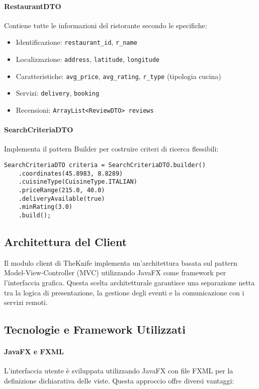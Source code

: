 \paragraph{RestaurantDTO}
Contiene tutte le informazioni del ristorante secondo le specifiche:
\begin{itemize}
    \item Identificazione: \texttt{restaurant\_id}, \texttt{r\_name}
    \item Localizzazione: \texttt{address}, \texttt{latitude}, \texttt{longitude}
    \item Caratteristiche: \texttt{avg\_price}, \texttt{avg\_rating}, \texttt{r\_type} (tipologia cucina)
    \item Servizi: \texttt{delivery}, \texttt{booking}
    \item Recensioni: \texttt{ArrayList<ReviewDTO> reviews}
\end{itemize}

\paragraph{SearchCriteriaDTO}
Implementa il pattern Builder per costruire criteri di ricerca flessibili:
\begin{verbatim}
SearchCriteriaDTO criteria = SearchCriteriaDTO.builder()
    .coordinates(45.8983, 8.8289)
    .cuisineType(CuisineType.ITALIAN)
    .priceRange(215.0, 40.0)
    .deliveryAvailable(true)
    .minRating(3.0)
    .build();
\end{verbatim}

\subsection{Architettura del Client}
\label{sec:client}
Il modulo client di TheKnife implementa un'architettura basata 
sul pattern Model-View-Controller (MVC) utilizzando JavaFX come 
framework per l'interfaccia grafica. Questa scelta architetturale 
garantisce una separazione netta tra la logica di presentazione, 
la gestione degli eventi e la comunicazione con i servizi remoti.

\subsection{Tecnologie e Framework Utilizzati}

\paragraph{JavaFX e FXML}
L'interfaccia utente è sviluppata utilizzando JavaFX con file FXML per la definizione dichiarativa delle viste. Questa approccio offre diversi vantaggi:

